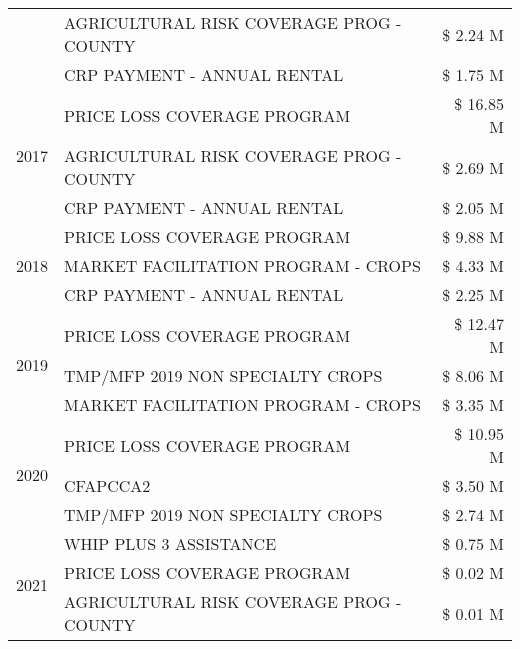 \begin{tabular}{llr}
 & AGRICULTURAL RISK COVERAGE PROG - COUNTY      & \$ 2.24 M \\
 & CRP PAYMENT - ANNUAL RENTAL                   & \$ 1.75 M \\
\cline{1-3}
\multirow[t]{3}{*}{2017} & PRICE LOSS COVERAGE PROGRAM & \$ 16.85 M \\
 & AGRICULTURAL RISK COVERAGE PROG - COUNTY & \$ 2.69 M \\
 & CRP PAYMENT - ANNUAL RENTAL & \$ 2.05 M \\
\cline{1-3}
\multirow[t]{3}{*}{2018} & PRICE LOSS COVERAGE PROGRAM & \$ 9.88 M \\
 & MARKET FACILITATION PROGRAM - CROPS & \$ 4.33 M \\
 & CRP PAYMENT - ANNUAL RENTAL & \$ 2.25 M \\
\cline{1-3}
\multirow[t]{3}{*}{2019} & PRICE LOSS COVERAGE PROGRAM & \$ 12.47 M \\
 & TMP/MFP 2019 NON SPECIALTY CROPS & \$ 8.06 M \\
 & MARKET FACILITATION PROGRAM - CROPS & \$ 3.35 M \\
\cline{1-3}
\multirow[t]{3}{*}{2020} & PRICE LOSS COVERAGE PROGRAM & \$ 10.95 M \\
 & CFAPCCA2 & \$ 3.50 M \\
 & TMP/MFP 2019 NON SPECIALTY CROPS & \$ 2.74 M \\
\cline{1-3}
\multirow[t]{3}{*}{2021} & WHIP PLUS 3 ASSISTANCE & \$ 0.75 M \\
 & PRICE LOSS COVERAGE PROGRAM & \$ 0.02 M \\
 & AGRICULTURAL RISK COVERAGE PROG - COUNTY & \$ 0.01 M \\
\cline{1-3}
\bottomrule
\end{tabular}
